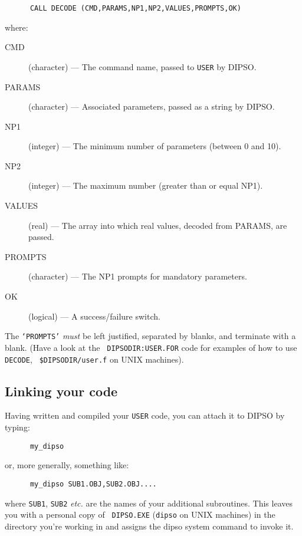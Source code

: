 \begin{verbatim}
      CALL DECODE (CMD,PARAMS,NP1,NP2,VALUES,PROMPTS,OK)
\end{verbatim}

where:

\begin{description}
\begin{description}
\item [CMD] (character) --- The command name, passed  to  {\tt USER} by DIPSO.
\item [PARAMS] (character) --- Associated parameters, passed as a string by
DIPSO.
\item [NP1] (integer) --- The minimum  number of parameters (between 0 and 10).
\item [NP2] (integer) --- The maximum number (greater than or equal NP1).
\item [VALUES] (real) --- The array into which real values, decoded from PARAMS,
are passed.
\item [PROMPTS] (character) --- The NP1 prompts for mandatory parameters.
\item [OK] (logical) --- A success/failure switch.
\end{description}
\end{description}

The {\tt `PROMPTS'} {\em must} be left justified, separated by blanks,
and terminate with a blank. (Have a look at the {\tt
DIPSODIR:USER.FOR} code for examples of how to use {\tt DECODE}, {\tt
\$DIPSODIR/user.f} on UNIX machines).

\subsection {Linking your code}

Having written and compiled your {\tt USER} code, you can attach it to DIPSO
by typing:

\begin{verbatim}
      my_dipso
\end{verbatim}

or, more generally, something like:

\begin{verbatim}
      my_dipso SUB1.OBJ,SUB2.OBJ....
\end{verbatim}

where {\tt SUB1}, {\tt SUB2} {\em etc.} are the names of your
additional subroutines. This leaves you with a personal copy of {\tt
DIPSO.EXE} ({\tt dipso} on UNIX machines) in the directory you're
working in and assigns the dipso system command to invoke it.

